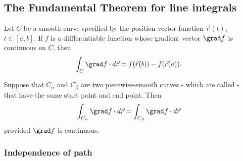 \documentclass{article}
\begin{document}
\subsection{The Fundamental Theorem for line integrals}


\begin{theorem}
    Let $C$ be a smooth curve specified by the position vector function 
    $\vec r(t)$, $t\in[a,b]$. If $f$ is a diffferentiable function
    whose gradient vector $\grad f$ is continuous on $C$, then
    \begin{align*}
        \int_C \grad f\cdot d\vec r = f(\vec r(b)) - f(\vec r(a)).
    \end{align*}
\end{theorem}
\begin{lemma}
    Suppose that $C_\alpha$ and $C_\beta$ are two piecewise-smooth curves
    - which are called  - that have the same start point and end
    point. Then
    \begin{align*}
        \int_{C_\alpha} \grad f \cdot d\vec r = \int_{C_\beta} \grad f \cdot d\vec r
    \end{align*}
    provided $\grad f$ is continuous.
\end{lemma}

\subsubsection{Independence of path}
\end{document}
